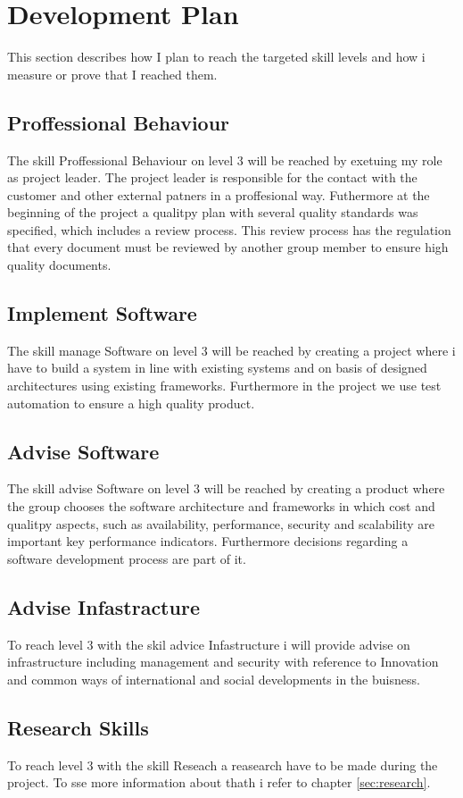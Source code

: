 \section{Development Plan}
\label{sec:development}
This section describes how I plan to reach the targeted skill levels and how i measure or prove that I reached them.

\subsection{Proffessional Behaviour}
The skill Proffessional Behaviour on level 3 will be reached by exetuing my role as project leader. The project leader is
responsible for the contact with the customer and other external patners in a proffesional way. 
\newline
Futhermore at the beginning of the project a qualitpy plan with several quality standards was specified, which includes a 
review process. This review process has the regulation that every document must be reviewed by another group member to ensure
high quality documents.

\subsection{Implement Software}
The skill manage Software on level 3 will be reached by creating a project where i have to build a system in line with existing systems and on basis of designed architectures 
using existing frameworks. Furthermore  in the project we use test automation to ensure a high quality product.

\subsection{Advise Software}
The skill advise Software on level 3 will be reached by creating a product where the group chooses the software architecture and frameworks in which cost and qualitpy
aspects, such as availability, performance, security and scalability are important key performance indicators. Furthermore decisions regarding a software development process 
are part of it.   

\subsection{Advise Infastracture}
To reach level 3 with the skil advice Infastructure i will provide advise on infrastructure including management and security
with reference to Innovation and common ways of international and social developments in the buisness.

\subsection{Research Skills}
To reach level 3 with the skill Reseach a reasearch have to be made during the project. To sse more information about thath i refer to chapter \ref{sec:research}.